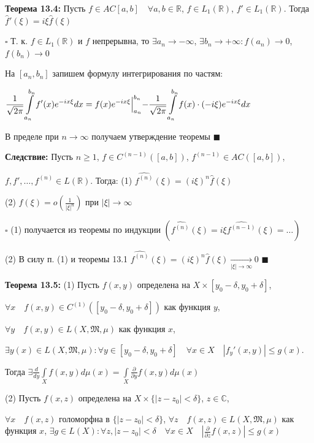 \documentclass[a4paper]{report}
\begin{document}
\noindent\textbf{Теорема 13.4:} Пусть $f\in AC[a,b]\quad\forall a,b\in\mathbb R$, $f\in L_1(\mathbb R)$, $f'\in L_1(\mathbb R)$. Тогда $\hat f'(\xi)=i\xi\hat f(\xi)$

\noindent $\square$ Т. к. $f\in L_1(\mathbb R)$ и $f$ непрерывна, то $\exists a_n\to-\infty$, $\exists b_n\to+\infty\colon f(a_n)\to0$, $f(b_n)\to0$

На $[a_n,b_n]$ запишем формулу интегрирования по частям: 

$\displaystyle\frac{1}{\sqrt{2\pi}}\displaystyle\int\limits_{a_n}^{b_n}f'(x)e^{-ix\xi}dx=f(x)e^{-ix\xi}\Bigl|_{a_n}^{b_n}-\frac{1}{\sqrt{2\pi}}\displaystyle\int\limits_{a_n}^{b_n}f(x)\cdot(-i\xi)e^{-ix\xi}dx$

В пределе при $n\to\infty$ получаем утверждение теоремы $\blacksquare$
\bigskip

\noindent\textbf{Следствие:} Пусть $n\ge1$, $f\in C^{(n-1)}([a,b])$, $f^{(n-1)}\in AC([a,b])$, 

\noindent $f,f',\ldots,f^{(n)}\in L(\mathbb R)$. 
Тогда: (1) $\widehat{f^{(n)}}(\xi)=(i\xi)^n\hat f(\xi)$

(2) $\hat f(\xi)=o\left(\frac{1}{|\xi|^n}\right)$ при $|\xi|\to\infty$

\noindent $\square$ (1) получается из теоремы по индукции $(\widehat{f^{(n)}}(\xi)=i\xi\widehat{f^{(n-1)}}(\xi)=\ldots)$

(2) В силу п. (1) и теоремы 13.1 $\widehat{f^{(n)}}(\xi)=(i\xi)^n\hat f(\xi)\xrightarrow[|\xi|\to\infty]{}0$ $\blacksquare$
\bigskip

\noindent\textbf{Теорема 13.5:} (1) Пусть $f(x,y)$ определена на $X\times[y_0-\delta,y_0+\delta]$,

 $\forall x\quad f(x,y)\in C^{(1)}([y_0-\delta,y_0+\delta])$ как функция $y$,

 $\forall y\quad f(x,y)\in L(X,\mathfrak M,\mu)$ как функция $x$,

 $\exists y(x)\in L(X,\mathfrak M,\mu)\colon\forall y\in[y_0-\delta,y_0+\delta]\quad\forall x\in X\quad |f_y'(x,y)|\le g(x)$. 

Тогда $\exists\displaystyle\frac{d}{dy}\displaystyle\int\limits_X f(x,y)d\mu(x)=\displaystyle\int\limits_X\frac{\partial}{\partial y}f(x,y)d\mu(x)$

(2) Пусть $f(x,z)$ определена на $X\times\{|z-z_0|<\delta\}$, $z\in\mathbb C$, 

$\forall x\quad f(x,z)$ голоморфна в $\{|z-z_0|<\delta\}$, $\forall z\quad f(x,z)\in L(X,\mathfrak M,\mu)$ как функция $x$, $\exists g\in L(X)\colon\forall z,|z-z_0|<\delta\quad\forall x\in X\quad\left|\displaystyle\frac{\partial}{\partial z}f(x,z)\right|\le g(x)$
\end{document}
